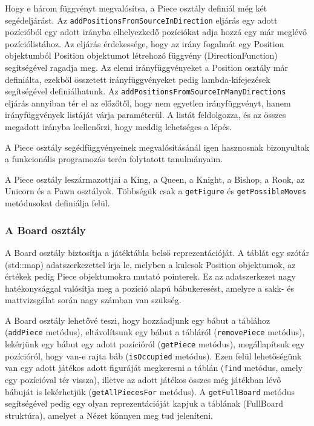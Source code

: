 \documentclass[12pt, twoside]{report}
\begin{document}
\begin{itemize}
	Hogy e három függvényt megvalósítsa, a Piece osztály definiál még két segédeljárást.
	\subitem Az {\tt addPositionsFromSourceInDirection} eljárás egy adott pozícióból egy adott irányba elhelyezkedő pozíciókat adja hozzá egy már meglévő pozíciólistához. Az eljárás érdekessége, hogy az irány fogalmát egy Position objektumból Position objektumot létrehozó függvény (DirectionFunction) segítségével ragadja meg. Az elemi irányfüggvényeket a Position osztály már definiálta, ezekből összetett irányfüggvényeket pedig lambda-kifejezések segítségével definiálhatunk.
	\subitem Az {\tt addPositionsFromSourceInManyDirections} eljárás annyiban tér el az előzőtől, hogy nem egyetlen irányfüggvényt, hanem irányfüggvények listáját várja paraméterül. A listát feldolgozza, és az összes megadott irányba leellenőrzi, hogy meddig lehetséges a lépés.
\end{itemize}
A Piece osztály segédfüggvényeinek megvalósításánál igen hasznosnak bizonyultak a funkcionális programozás terén folytatott tanulmányaim.

A Piece osztály leszármazottjai a King, a Queen, a Knight, a Bishop, a Rook, az Unicorn és a Pawn osztályok. Többségük csak a {\tt getFigure} és {\tt getPossibleMoves} metódusokat definiálja felül.

\subsubsection{A Board osztály}

A Board osztály biztosítja a játéktábla belső reprezentációját. A táblát egy szótár (std::map) adatszerkezettel írja le, melyben a kulcsok Position objektumok, az értékek pedig Piece objektumokra mutató pointerek. Ez az adatszerkezet nagy hatékonysággal valósítja meg a pozíció alapú bábukeresést, amelyre a sakk- és mattvizsgálat során nagy számban van szükség.

A Board osztály lehetővé teszi, hogy hozzáadjunk egy bábut a táblához ({\tt addPiece} metódus), eltávolítsunk egy bábut a tábláról ({\tt removePiece} metódus), lekérjünk egy bábut egy adott pozícióról ({\tt getPiece} metódus), megállapítsuk egy pozícióról, hogy van-e rajta báb ({\tt isOccupied} metódus). Ezen felül lehetőségünk van egy adott játékos adott figuráját megkeresni a táblán ({\tt find} metódus, amely egy pozícióval tér vissza), illetve az adott játékos összes még játékban lévő bábuját is lekérhetjük ({\tt getAllPiecesFor} metódus). A {\tt getFullBoard} metódus segítségével pedig egy olyan reprezentációját kapjuk a táblának (FullBoard struktúra), amelyet a Nézet könnyen meg tud jeleníteni.
\end{document}
